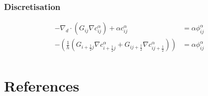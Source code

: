 \documentclass[11pt]{article}
\begin{document}
\subsubsection{Discretisation}
\label{sec:orgf2e3e35}

\begin{align*}
- \nabla_d \cdot  (G_{ij} \nabla c_{ij}^\alpha) + \alpha  c_{ij}^\alpha &= \alpha \phi_{ij}^\alpha \\
- (\frac{1}{h}(G_{i+\frac{1}{2}j} \nabla c^\alpha_{i+\frac{1}{2}j} + G_{ij+\frac{1}{2}} \nabla c^\alpha_{ij+\frac{1}{2}}))  &= \alpha  \phi_{ij}^\alpha \\
\end{align*}
\section{References}
\label{sec:orge455982}
\printbibliography
\end{document}
